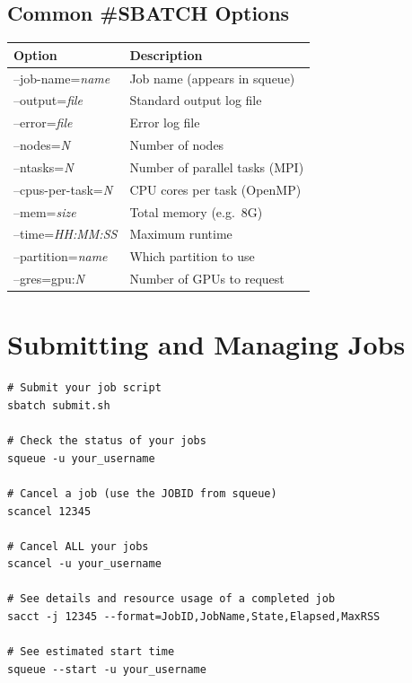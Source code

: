 \documentclass[12pt,a4paper]{article}
\begin{document}
\subsection{Common \#SBATCH Options}

\begin{center}
\begin{tabular}{>{\ttfamily}lp{8cm}}
\toprule
\normalfont\textbf{Option} & \textbf{Description} \\
\midrule
--job-name=\textit{name}       & Job name (appears in squeue) \\
--output=\textit{file}         & Standard output log file \\
--error=\textit{file}          & Error log file \\
--nodes=\textit{N}             & Number of nodes \\
--ntasks=\textit{N}            & Number of parallel tasks (MPI) \\
--cpus-per-task=\textit{N}     & CPU cores per task (OpenMP) \\
--mem=\textit{size}            & Total memory (e.g.\ 8G) \\
--time=\textit{HH:MM:SS}       & Maximum runtime \\
--partition=\textit{name}      & Which partition to use \\
--gres=gpu:\textit{N}          & Number of GPUs to request \\
\bottomrule
\end{tabular}
\end{center}

\section{Submitting and Managing Jobs}

\begin{lstlisting}[style=bash]
# Submit your job script
sbatch submit.sh

# Check the status of your jobs
squeue -u your_username

# Cancel a job (use the JOBID from squeue)
scancel 12345

# Cancel ALL your jobs
scancel -u your_username

# See details and resource usage of a completed job
sacct -j 12345 --format=JobID,JobName,State,Elapsed,MaxRSS

# See estimated start time
squeue --start -u your_username
\end{lstlisting}
\end{document}
